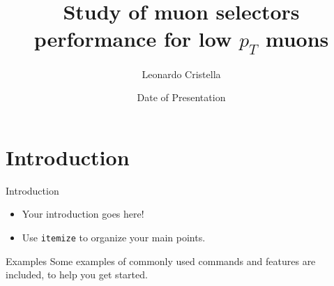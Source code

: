\documentclass{beamer}
\title[Muon selectors]{Study of muon selectors performance for low $p_T$ muons}
\author{Leonardo Cristella}
\institute{University \& INFN of Bari}
\date{Date of Presentation}
\begin{document}
\begin{frame}
  \titlepage
\end{frame}


\section{Introduction}

\begin{frame}{Introduction}

\begin{itemize}
  \item Your introduction goes here!
  \item Use \texttt{itemize} to organize your main points.
\end{itemize}

\vskip 1cm

\begin{block}{Examples}
Some examples of commonly used commands and features are included, to help you get started.
\end{block}

\end{frame}

\def\analyses{BPH-15-005, BPH-18-002, BPH-16-004}
\def\titles{{%
"Quarkonium cross sections with early data at c.o.m. energy of 13 TeV",%
"Search for resonances decaying to $\Upsilon(1S)$ + two leptons",%
"Measurement of $B_s \to \mu \mu$ effective lifetime and search for $B^0 \to \mu \mu$"
}}

\def\samples{$t\bar{t}$, $QCD + Z \to \mu\mu$, $J/\psi \to \mu \mu$}

\def\matchings{MatchedPrimaryMuon, MatchedMuonFromHeavyFlavour, MatchedMuonFromB, MatchedMuonFromBtoC, MatchedMuonFromC}
\end{document}
